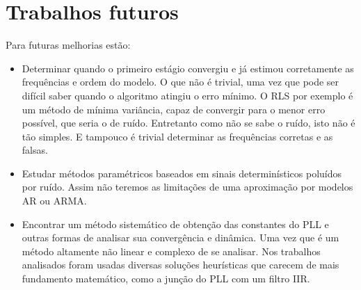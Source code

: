 \section{Trabalhos futuros}

Para futuras melhorias estão:
\begin{itemize}
	\item Determinar quando o primeiro estágio convergiu e já estimou corretamente as frequências e ordem do modelo. O que não é trivial, uma vez que pode ser difícil saber quando o algoritmo atingiu o erro mínimo. O RLS por exemplo é um método de mínima variância, capaz de convergir para o menor erro possível, que seria o de ruído. Entretanto como não se sabe o ruído, isto não é tão simples. E tampouco é trivial determinar as frequências corretas e as falsas.
	\item Estudar métodos paramétricos baseados em sinais determinísticos poluídos por ruído. Assim não teremos as limitações de uma aproximação por modelos AR ou ARMA. 
	\item Encontrar um método sistemático de obtenção das constantes do PLL e outras formas de analisar sua convergência e dinâmica. Uma vez que é um método altamente não linear e complexo de se analisar. Nos trabalhos analisados foram usadas diversas soluções heurísticas que carecem de mais fundamento matemático, como a junção do PLL com um filtro IIR.
\end{itemize}